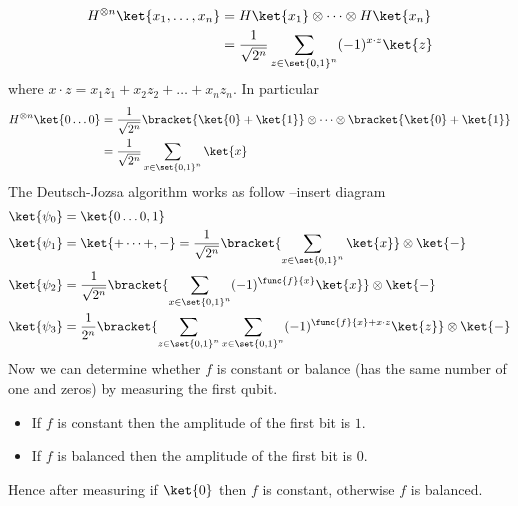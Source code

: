 \begin{align*}
    H^{\otimes n} \ket{x_1, \dots, x_n} &= H \ket{x_1} \otimes \dots \otimes H \ket{x_n}\\
    &= \dfrac{1}{\sqrt{2^n}} \sum_{z \in \set{0,1}^n} (-1)^{x \cdot z} \ket{z}
\end{align*}
where \(x \cdot z = x_1z_1 + x_2 z_2 + \dots + x_n z_n\). In particular 
\begin{align*}
    H^{\otimes n} \ket{0 \dots 0} &= \dfrac{1}{\sqrt{2^n}} \bracket{ \ket{0}  + \ket{1}} \otimes \dots \otimes \bracket{\ket{0} + \ket{1}}\\
    &= \dfrac{1}{\sqrt{2^n}} \sum_{x \in \set{0,1}^n} \ket{x}\\
\end{align*}
The Deutsch-Jozsa algorithm works as follow --insert diagram 
\begin{align*}
    \ket{\psi_0} &= \ket{0\dots 0, 1}\\
    \ket{\psi_1} &= \ket{+ \dots +, -} = \dfrac{1}{\sqrt{2^n}} \bracket{\sum_{x \in \set{0,1}^n} \ket{x} } \otimes \ket{-}\\ 
    \ket{\psi_2} &= \dfrac{1}{\sqrt{2^n}} \bracket{\sum_{x \in \set{0,1}^n} (-1)^{\func{f}{x}}\ket{x} } \otimes \ket{-}\\
    \ket{\psi_3} &= \dfrac{1}{2^n} \bracket{\sum_{z \in \set{0,1}^n} \sum_{x \in \set{0,1}^n}  (-1)^{\func{f}{x} + x \cdot z} \ket{z}} \otimes \ket{-}
\end{align*}
Now we can determine whether \(f\) is constant or balance (has the same number of one and zeros) by measuring the first qubit. 
\begin{itemize}
    \item If \(f\) is constant then the amplitude of the first bit is \(1\).
    \item If \(f\) is balanced then the amplitude of the first bit is \(0\).
\end{itemize}
Hence after measuring if \(\ket{0}\) then \(f\) is constant, otherwise \(f\) is balanced. 



